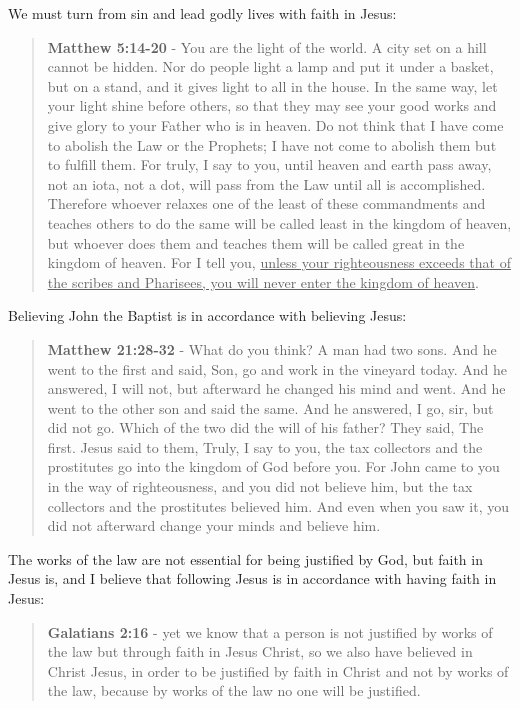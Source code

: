 \documentclass[11pt]{article}
\begin{document}
We must turn from sin and lead godly lives with faith in Jesus:

\begin{quote}
\textbf{Matthew 5:14-20} - You are the light of the world. A city set on a hill cannot be hidden. Nor do people light a lamp and put it under a basket, but on a stand, and it gives light to all in the house. In the same way, let your light shine before others, so that they may see your good works and give glory to your Father who is in heaven. Do not think that I have come to abolish the Law or the Prophets; I have not come to abolish them but to fulfill them. For truly, I say to you, until heaven and earth pass away, not an iota, not a dot, will pass from the Law until all is accomplished. Therefore whoever relaxes one of the least of these commandments and teaches others to do the same will be called least in the kingdom of heaven, but whoever does them and teaches them will be called great in the kingdom of heaven. For I tell you, \uline{unless your righteousness exceeds that of the scribes and Pharisees, you will never enter the kingdom of heaven}.
\end{quote}

Believing John the Baptist is in accordance with believing Jesus:

\begin{quote}
\textbf{Matthew 21:28-32} - What do you think? A man had two sons. And he went to the first and said, Son, go and work in the vineyard today. And he answered, I will not, but afterward he changed his mind and went. And he went to the other son and said the same. And he answered, I go, sir, but did not go. Which of the two did the will of his father? They said, The first. Jesus said to them, Truly, I say to you, the tax collectors and the prostitutes go into the kingdom of God before you. For John came to you in the way of righteousness, and you did not believe him, but the tax collectors and the prostitutes believed him. And even when you saw it, you did not afterward change your minds and believe him.
\end{quote}

The works of the law are not essential for being justified by God, but faith in Jesus is, and I believe that following Jesus is in accordance with having faith in Jesus:

\begin{quote}
\textbf{Galatians 2:16} - yet we know that a person is not justified by works of the law but through faith in Jesus Christ, so we also have believed in Christ Jesus, in order to be justified by faith in Christ and not by works of the law, because by works of the law no one will be justified.
\end{quote}
\end{document}
